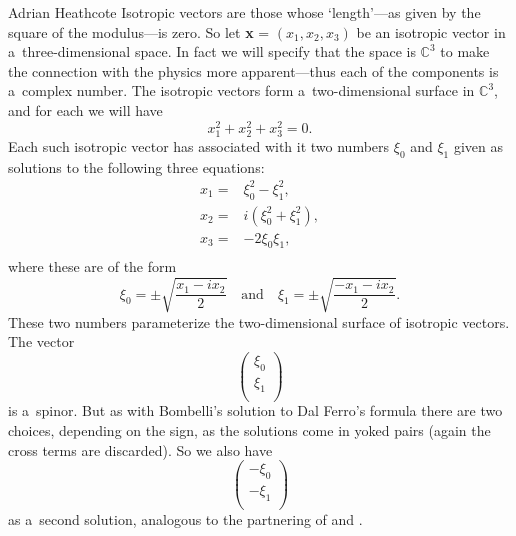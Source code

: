 \begin{artengenv}{Adrian Heathcote}
Isotropic vectors are those whose `length'---as given by the square of the modulus---is zero. So let \textbf{x} = $(x_{1}, x_{2}, x_{3})$ be an isotropic vector in a~three-dimensional space. In fact we will specify that the space is $\mathbb{C}^{3}$ to make the connection with the physics more apparent---thus each of the components is a~complex number. The isotropic vectors form a~two-dimensional surface in $\mathbb{C}^{3}$, and for each we will have $$x_{1}^{2} + x_{2}^{2} + x_{3}^{2} = 0.$$ Each such isotropic vector has associated with it two numbers $\xi_{0}$ and $\xi_{1}$ given as solutions to the following three equations: \[  \begin{array}{cc}
x_{1} = & \xi_{0}^{2} - \xi_{1}^{2},   \\[2.0mm]
x_{2} =  & i(\xi_{0}^{2} + \xi_{1}^{2}), \\[2.0mm]
x_{3} =  & -2 \xi_{0} \xi_{1}, \\
 \end{array} \] 
where these are of the form $$\xi_{0} = \pm \sqrt{\frac{x_{1} - ix_{2}}{2}}\quad \mbox{and}\quad  \xi_{1} = \pm \sqrt{\frac{- x_{1} - ix_{2}}{2}}.$$ These two numbers parameterize the two-dimensional surface of isotropic vectors. The vector  \[ \left( \begin{array}{c}
\xi_{0} \\
\xi_{1} \\ \end{array} \right)\] 
is a~spinor. But as with Bombelli's solution to Dal Ferro's formula there are two choices, depending on the sign, as the solutions come in yoked pairs (again the cross terms are discarded). So we also have
\[ \left( \begin{array}{c}
- \xi_{0} \\
- \xi_{1} \\ \end{array} \right)\] as a~second solution, analogous to the partnering of  and \mbox{.}


\end{artengenv}
